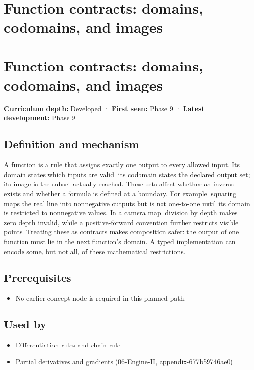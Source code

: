 \hypertarget{appendix-a59658325cd6}{}
\section*{Function contracts: domains, codomains, and images}
\section{Function contracts: domains, codomains, and images}\label{function-contracts-domains-codomains-and-images}

\textbf{Curriculum depth:} Developed · \textbf{First seen:} Phase 9 · \textbf{Latest development:} Phase 9

\subsection{Definition and mechanism}\label{definition-and-mechanism}

A function is a rule that assigns exactly one output to every allowed input. Its domain states which inputs are valid; its codomain states the declared output set; its image is the subset actually reached. These sets affect whether an inverse exists and whether a formula is defined at a boundary. For example, squaring maps the real line into nonnegative outputs but is not one-to-one until its domain is restricted to nonnegative values. In a camera map, division by depth makes zero depth invalid, while a positive-forward convention further restricts visible points. Treating these as contracts makes composition safer: the output of one function must lie in the next function's domain. A typed implementation can encode some, but not all, of these mathematical restrictions.

\subsection{Prerequisites}\label{prerequisites}

\begin{itemize}
\tightlist
\item
  No earlier concept node is required in this planned path.
\end{itemize}

\subsection{Used by}\label{used-by}

\begin{itemize}
\tightlist
\item
  \hyperref[appendix-d9f70bdfbc92]{Differentiation rules and chain rule}
\item
  \href{}{Partial derivatives and gradients (06-Engine-II, appendix-677b59746ae0)}
\end{itemize}

